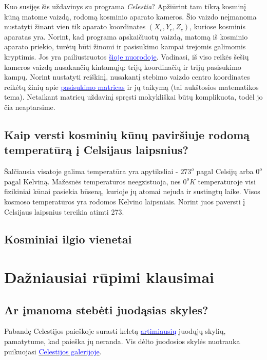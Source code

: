 \documentclass[a4paper]{article}
\newcommand{\goto}[2]{\href{\detokenize{#1}}{\textcolor{blue}{#2}}}
\begin{document}
Kuo susijęs šis uždavinys su programa \textit{Celestia}? Apžiūrint tam tikrą kosminį kūną matome vaizdą, rodomą kosminio aparato kameros. Šio vaizdo neįmanoma nustatyti žinant vien tik aparato koordinates $(X_c, Y_c, Z_c)$, kuriose kosminis aparatas yra. Norint, kad programa apskaičiuotų vaizdą, matomą iš kosminio aparato priekio, turėtų būti žinomi ir pasisukimo kampai trejomis galimomis kryptimis. Jos yra pailiustruotos \goto{https://www.youtube.com/watch?v=pQ24NtnaLl8}{šioje nuorodoje}. Vadinasi, iš viso reikės šešių kameros vaizdą nusakančių kintamųjų: trijų koordinačių ir trijų pasisukimo kampų. Norint nustatyti reiškinį, nusakantį stebimo vaizdo centro koordinates reikėtų žinių apie \goto{https://en.wikipedia.org/wiki/Rotation_matrix}{pasisukimo matricas} ir jų taikymą (tai aukštosios matematikos tema). Netaikant matricų uždavinį spręsti mokykliškai būtų komplikuota, todėl jo čia neaptarsime.

\subsection*{Kaip versti kosminių kūnų paviršiuje rodomą temperatūrą į Celsijaus laipsnius?}

Šalčiausia visatoje galima temperatūra yra apytiksliai - $273^o$ pagal Celsijų arba $0^o$ pagal Kelviną. Mažesnės temperatūros neegzistuoja, nes $0^oK$ temperatūroje visi fizikiniai kūnai pasiekia būseną, kurioje jų atomai nejuda ir sustingtų laike. Visos kosmoso temperatūros yra rodomos Kelvino laipsniais. Norint juos paversti į Celsijaus laipsnius tereikia atimti 273.

\subsection*{Kosminiai ilgio vienetai}

\section*{Dažniausiai rūpimi klausimai}
  
\subsection*{Ar įmanoma stebėti juodąsias skyles?}

Pabandę Celestijos paieškoje surasti keletą \goto{https://en.wikipedia.org/wiki/List_of_nearest_black_holes}{artimiausių} juodųjų skylių, pamatytume, kad paieška jų neranda. Vis dėlto juodosios skylės nuotrauka puikuojasi \goto{https://celestia.space/gallery.html}{Celestijos galerijoje}. 
\end{document}
